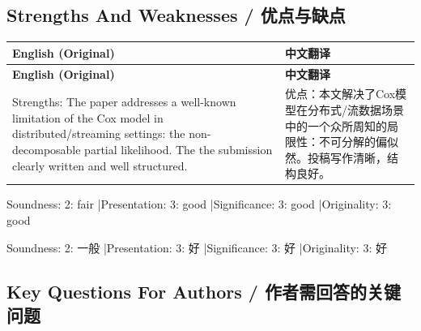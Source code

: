 \documentclass[10pt,a4paper]{article}
\begin{document}
\subsection{Strengths And Weaknesses / 优点与缺点}

\begin{longtable}{L{0.48\textwidth}|L{0.48\textwidth}}
\hline
\textbf{English (Original)} & \textbf{中文翻译} \\
\hline
\endfirsthead
\hline
\textbf{English (Original)} & \textbf{中文翻译} \\
\hline
\endhead
Strengths: The paper addresses a well-known limitation of the Cox model in distributed/streaming settings: the non-decomposable partial likelihood. The the submission clearly written and well structured.
&
优点：本文解决了Cox模型在分布式/流数据场景中的一个众所周知的局限性：不可分解的偏似然。投稿写作清晰，结构良好。 \\
\hline
\end{longtable}

\noindent Soundness: 2: fair \quad|\quad Presentation: 3: good \quad|\quad Significance: 3: good \quad|\quad Originality: 3: good

\noindent Soundness: 2: 一般 \quad|\quad Presentation: 3: 好 \quad|\quad Significance: 3: 好 \quad|\quad Originality: 3: 好

\subsection{Key Questions For Authors / 作者需回答的关键问题}
\end{document}
